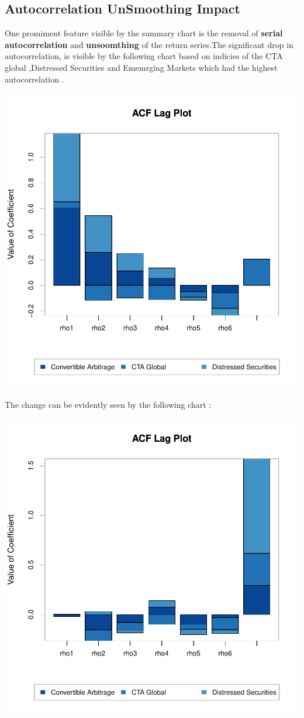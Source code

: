 \documentclass[12pt,letterpaper,english]{article}
\begin{document}
\subsection{Autocorrelation UnSmoothing Impact}
One promiment feature visible by the summary chart is the removal of \textbf{serial autocorrelation} and \textbf{unsoomthing} of the return series.The significant drop in autocorrelation, is visible by the following chart based on  indicies of the CTA global ,Distressed Securities and Ememrging Markets which had the highest autocorrelation .

\includegraphics{UnSmoothReturnAnalysis-005}

The change can be evidently seen by the following chart :


\includegraphics{UnSmoothReturnAnalysis-006}
\end{document}
